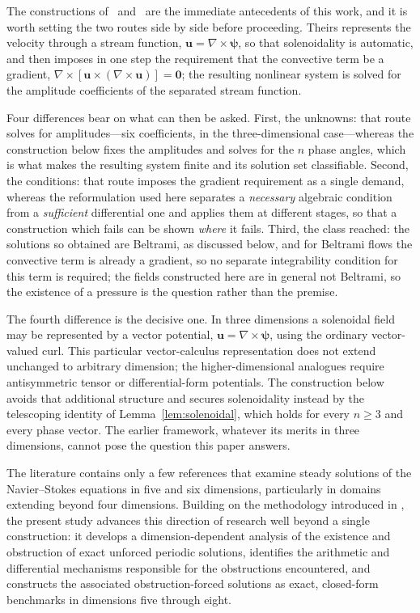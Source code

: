 \documentclass[11pt]{jfm}
\let\ge=\geqslant  \let\geq=\geqslant
\numberwithin{equation}{section}
\begin{document}
The constructions of~\citet{eth} and~\citet{ant} are the immediate antecedents of this work, and it
is worth setting the two routes side by side before proceeding. Theirs represents the velocity through a stream function,
$\boldsymbol{u}=\nabla\times\boldsymbol{\psi}$, so that solenoidality is automatic, and then
imposes in one step the requirement that the convective term be a gradient,
$\nabla\times[\boldsymbol{u}\times(\nabla\times\boldsymbol{u})]=\boldsymbol{0}$; the resulting
nonlinear system is solved for the amplitude coefficients of the separated stream function.

Four differences bear on what can then be asked. First, the unknowns: that route solves for
amplitudes---six coefficients, in the three-dimensional case---whereas the construction below fixes
the amplitudes and solves for the $n$ phase angles, which is what makes the resulting system finite
and its solution set classifiable. Second, the conditions: that route imposes the gradient
requirement as a single demand, whereas the reformulation used here separates a
\emph{necessary} algebraic condition from a \emph{sufficient} differential one and applies them at
different stages, so that a construction which fails can be shown \emph{where} it fails. Third, the
class reached: the solutions so obtained are Beltrami, as discussed below, and for Beltrami flows the convective
term is already a gradient, so no separate integrability condition for this term is required; the fields constructed here are in general not Beltrami, so the
existence of a pressure is the question rather than the premise.

The fourth difference is the decisive one. In three dimensions a solenoidal field may be
represented by a vector potential, $\boldsymbol{u}=\nabla\times\boldsymbol{\psi}$, using the
ordinary vector-valued curl. This particular vector-calculus representation does not extend
unchanged to arbitrary dimension; the higher-dimensional analogues require antisymmetric tensor or
differential-form potentials. The construction below avoids that additional structure and secures
solenoidality instead by the telescoping identity of Lemma~\ref{lem:solenoidal}, which holds for
every $n\ge3$ and every phase vector. The earlier framework, whatever its merits in three
dimensions, cannot pose the question this paper answers.

The literature contains only a few references \cite{str1, str2, don} that examine
steady solutions of the Navier--Stokes equations in five and six dimensions,
particularly in domains extending beyond four dimensions. Building on the methodology
introduced in \cite{tha4}, the present study advances this direction of research well
beyond a single construction: it develops a dimension-dependent analysis of the
existence and obstruction of exact unforced periodic solutions, identifies the
arithmetic and differential mechanisms responsible for the obstructions encountered,
and constructs the associated obstruction-forced solutions as exact, closed-form
benchmarks in dimensions five through eight.
\end{document}

